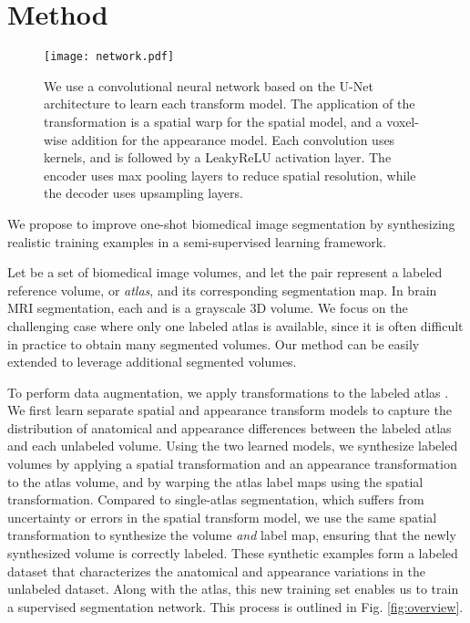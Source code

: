 \documentclass[10pt,twocolumn,letterpaper]{article}
\begin{document}
%
 \section{Method}
\begin{figure*}[t]
    \centering
        \texttt{[image: network.pdf]}
    \caption{We use a convolutional neural network based on the U-Net architecture \cite{ronneberger2015u} to learn each transform model. The application of the transformation is a spatial warp for the spatial model, and a voxel-wise addition for the appearance model. Each convolution uses  kernels, and is followed by a LeakyReLU activation layer. The encoder uses max pooling layers to reduce spatial resolution, while the decoder uses upsampling layers. }\label{fig:network}
\end{figure*}

We propose to improve one-shot biomedical image segmentation by synthesizing realistic training examples in a semi-supervised learning framework. 


Let  be a set of biomedical image volumes, and let the pair  represent a labeled reference volume, or \textit{atlas}, and its corresponding segmentation map. In brain MRI segmentation, each  and  is a grayscale 3D volume. We focus on the challenging case where only one labeled atlas is available, since it is often difficult in practice to obtain many segmented volumes. Our method can be easily extended to leverage additional segmented volumes. 

To perform data augmentation, we apply transformations  to the labeled atlas . We first learn separate spatial and appearance transform models to capture the distribution of anatomical and appearance differences between the labeled atlas and each unlabeled volume. Using the two learned models, we synthesize labeled volumes  by applying a spatial transformation and an appearance transformation to the atlas volume, and by warping the atlas label maps using the spatial transformation. Compared to single-atlas segmentation, which suffers from uncertainty or errors in the spatial transform model, we use the same spatial transformation to synthesize the volume \textit{and} label map, ensuring that the newly synthesized volume is correctly labeled. These synthetic examples form a labeled dataset that characterizes the anatomical and appearance variations in the unlabeled dataset. Along with the atlas, this new training set enables us to train a supervised segmentation network. This process is outlined in Fig. \ref{fig:overview}. 
\end{document}
